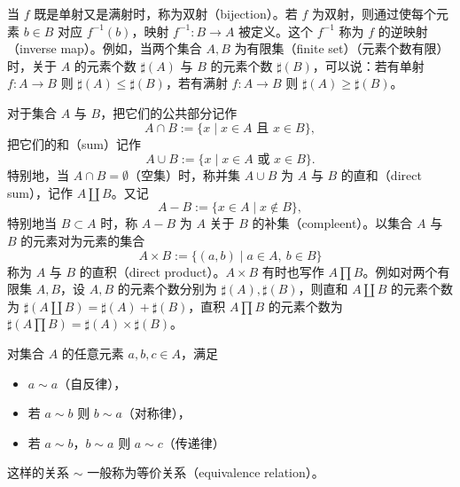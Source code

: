 当 $f$ 既是单射又是满射时，称为双射（bijection）。若 $f$ 为双射，则通过使每个元素 $b\in B$ 对应 $f^{-1}(b)$，映射 $f^{-1}\colon B\to A$ 被定义。这个 $f^{-1}$ 称为 $f$ 的逆映射（inverse map）。例如，当两个集合 $A,B$ 为有限集（finite set）（元素个数有限）时，关于 $A$ 的元素个数 $\sharp(A)$ 与 $B$ 的元素个数 $\sharp(B)$，可以说：若有单射 $f\colon A\to B$ 则 $\sharp(A)\le\sharp(B)$，若有满射 $f\colon A\to B$ 则 $\sharp(A)\ge\sharp(B)$。


对于集合 $A$ 与 $B$，把它们的公共部分记作
\[
  A\cap B := \{x \mid x\in A \text{ 且 } x\in B\},
\]
把它们的和（sum）记作
\[
  A\cup B := \{x \mid x\in A \text{ 或 } x\in B\}.
\]
特别地，当 $A\cap B=\emptyset$（空集）时，称并集 $A\cup B$ 为 $A$ 与 $B$ 的直和（direct sum），记作 $A\coprod B$。又记
\[
  A-B := \{x\in A \mid x\notin B\},
\]
特别地当 $B\subset A$ 时，称 $A-B$ 为 $A$ 关于 $B$ 的补集（compleent）。以集合 $A$ 与 $B$ 的元素对为元素的集合
\[
  A\times B := \{(a,b) \mid a\in A,\ b\in B\}
\]
称为 $A$ 与 $B$ 的直积（direct product）。$A\times B$ 有时也写作 $A\prod B$。例如对两个有限集 $A,B$，设 $A,B$ 的元素个数分别为 $\sharp(A),\sharp(B)$，则直和 $A\coprod B$ 的元素个数为 $\sharp(A\coprod B)=\sharp(A)+\sharp(B)$，直积 $A\prod B$ 的元素个数为 $\sharp(A\prod B)=\sharp(A)\times\sharp(B)$。


对集合 $A$ 的任意元素 $a,b,c\in A$，满足
\begin{itemize}
  \item $a\sim a$（自反律），
  \item 若 $a\sim b$ 则 $b\sim a$（对称律），
  \item 若 $a\sim b$，$b\sim a$ 则 $a\sim c$（传递律）
\end{itemize}
这样的关系 $\sim$ 一般称为等价关系（equivalence relation）。

